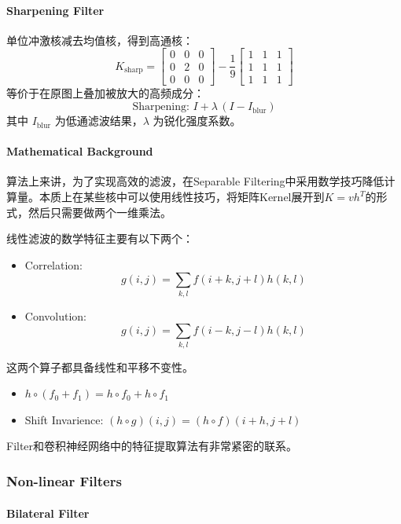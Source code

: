 \paragraph{Sharpening Filter}
单位冲激核减去均值核，得到高通核：
$$K_{\text{sharp}} = \begin{bmatrix} 0 & 0 & 0 \\ 0 & 2 & 0 \\ 0 & 0 & 0 \end{bmatrix} - \frac{1}{9}\begin{bmatrix} 1 & 1 & 1 \\ 1 & 1 & 1 \\ 1 & 1 & 1 \end{bmatrix}$$
等价于在原图上叠加被放大的高频成分：
$$\text{Sharpening: } I + \lambda\,(I - I_{\text{blur}})$$
其中 $I_{\text{blur}}$ 为低通滤波结果，$\lambda$ 为锐化强度系数。

\paragraph{Mathematical Background}
算法上来讲，为了实现高效的滤波，在Separable Filtering中采用数学技巧降低计算量。本质上在某些核中可以使用线性技巧，将矩阵Kernel展开到$K = vh^{T}$的形式，然后只需要做两个一维乘法。

线性滤波的数学特征主要有以下两个：

\begin{itemize}
    \item Correlation: $$g(i,j) = \sum_{k,l}f(i+k,j+l)h(k,l)$$
    \item Convolution: $$g(i,j) = \sum_{k,l}f(i-k,j-l)h(k,l)$$
\end{itemize}

这两个算子都具备线性和平移不变性。

\begin{itemize}
    \item $h \circ (f_0+f_1) = h \circ f_0 + h \circ f_1$
    \item Shift Invarience: $(h \circ g)(i , j) = (h \circ f)(i + h , j + l) $ 
\end{itemize}

Filter和卷积神经网络中的特征提取算法有非常紧密的联系。

\subsubsection{Non-linear Filters}

\paragraph{Bilateral Filter}

